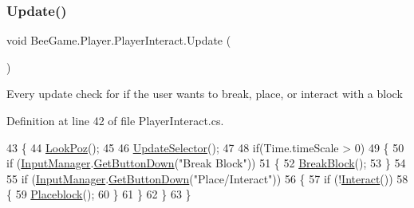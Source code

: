 \mbox{\label{class_bee_game_1_1_player_1_1_player_interact_a795e661cbe900f8a46f8d8667ec43474}} 
\subsubsection{\texorpdfstring{Update()}{Update()}}
{\footnotesize\ttfamily void Bee\+Game.\+Player.\+Player\+Interact.\+Update (\begin{DoxyParamCaption}{ }\end{DoxyParamCaption})\hspace{0.3cm}{\ttfamily [private]}}



Every update check for if the user wants to break, place, or interact with a block 



Definition at line 42 of file Player\+Interact.\+cs.


\begin{DoxyCode}
43         \{
44             \hyperlink{class_bee_game_1_1_player_1_1_player_interact_aacd8f7a70e55d018285ac5f0fd799fd9}{LookPoz}();
45 
46             \hyperlink{class_bee_game_1_1_player_1_1_player_interact_a22c84b1a000dbc8775eb9e9d396f26ff}{UpdateSelector}();
47 
48             \textcolor{keywordflow}{if}(Time.timeScale > 0)
49             \{
50                 \textcolor{keywordflow}{if} (\hyperlink{class_bee_game_1_1_core_1_1_input_manager}{InputManager}.\hyperlink{class_bee_game_1_1_core_1_1_input_manager_ac90aab89652007118b67f60e962103c5}{GetButtonDown}(\textcolor{stringliteral}{"Break Block"}))
51                 \{
52                     \hyperlink{class_bee_game_1_1_player_1_1_player_interact_a3507c5b70c4aecb332338d518b691875}{BreakBlock}();
53                 \}
54 
55                 \textcolor{keywordflow}{if} (\hyperlink{class_bee_game_1_1_core_1_1_input_manager}{InputManager}.\hyperlink{class_bee_game_1_1_core_1_1_input_manager_ac90aab89652007118b67f60e962103c5}{GetButtonDown}(\textcolor{stringliteral}{"Place/Interact"}))
56                 \{
57                     \textcolor{keywordflow}{if} (!\hyperlink{class_bee_game_1_1_player_1_1_player_interact_a47059ea03d8b16b406ed5218c52198a3}{Interact}())
58                     \{
59                         \hyperlink{class_bee_game_1_1_player_1_1_player_interact_a55ce2fd36c1120aed30893502f1e909f}{Placeblock}();
60                     \}
61                 \}
62             \}
63         \}
\end{DoxyCode}
\mbox{\label{class_bee_game_1_1_player_1_1_player_interact_a22c84b1a000dbc8775eb9e9d396f26ff}} 
